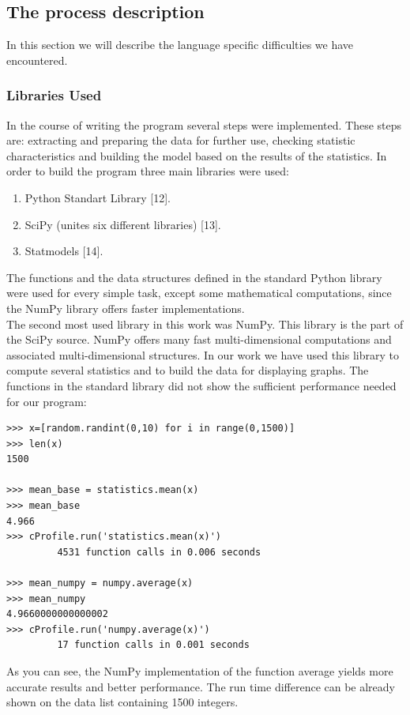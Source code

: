 \documentclass[
  twoside,
  12pt, a4paper,
  footinclude=true,
  headinclude=true,
  cleardoublepage=empty
]{article}
\begin{document}
\subsection{The process description}
In this section we will describe the language specific difficulties we have encountered.
\subsubsection{Libraries Used}
In the course of writing the program several steps were implemented. These steps are: extracting and preparing the data for further use, checking statistic characteristics and building the model based on the results of the statistics. In order to build the program three main libraries were used:
\begin{enumerate}
    \item Python Standart Library [12].
    \item SciPy (unites six different libraries) [13].
    \item Statmodels [14].
\end{enumerate}
The functions and the data structures defined in the standard Python library were used for every simple task, except some mathematical computations, since the NumPy library offers faster implementations.\\
The second most used library in this work was NumPy. This library is the part of the SciPy source. NumPy offers many fast multi-dimensional computations and associated multi-dimensional structures. In our work we have used this library to compute several statistics and to build the data for displaying graphs. The functions in the standard library did not show the sufficient performance needed for our program:
\begin{verbatim}
>>> x=[random.randint(0,10) for i in range(0,1500)]
>>> len(x)
1500

>>> mean_base = statistics.mean(x)
>>> mean_base
4.966
>>> cProfile.run('statistics.mean(x)')   
         4531 function calls in 0.006 seconds
        
>>> mean_numpy = numpy.average(x)
>>> mean_numpy
4.9660000000000002
>>> cProfile.run('numpy.average(x)')
         17 function calls in 0.001 seconds
\end{verbatim}   
As you can see, the NumPy implementation of the function average yields more accurate results and better performance. The run time difference can be already shown on the data list containing 1500 integers.\\
\end{document}
